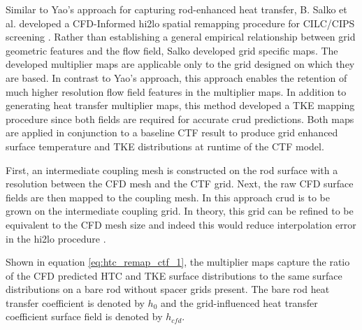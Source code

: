     Similar to Yao's approach for capturing rod-enhanced heat transfer,  B. Salko et al. developed a CFD-Informed hi2lo spatial remapping procedure for CILC/CIPS screening \cite{salko17}.  Rather than establishing a general empirical relationship between grid geometric features and the flow field, Salko developed grid specific maps.  The developed multiplier maps are applicable only to the grid designed on which they are based.  In contrast to Yao's approach, this approach enables the retention of much higher resolution flow field features in the multiplier maps.  In addition to generating heat transfer multiplier maps, this method developed a TKE mapping procedure since both fields are required for accurate crud predictions.  Both maps are applied in conjunction to a baseline CTF result to produce grid enhanced surface temperature and TKE distributions at runtime of the CTF model.
    
    First, an intermediate coupling mesh is constructed on the rod surface with a resolution between the CFD mesh and the CTF grid.  Next, the raw CFD surface fields are then mapped to the coupling mesh.  In this approach crud is to be grown on the intermediate coupling grid.  In theory, this grid can be refined to be equivalent to the CFD mesh size and indeed this would reduce interpolation error in the hi2lo procedure \cite{salko17}.
       
    Shown in equation \ref{eq:htc_remap_ctf_1},  the multiplier maps capture the ratio of the CFD predicted HTC and TKE surface distributions to the same surface distributions on a bare rod without spacer grids present.  The bare rod heat transfer coefficient is denoted by $h_0$ and the grid-influenced heat transfer coefficient surface field is denoted by $h_{cfd}$.
    
